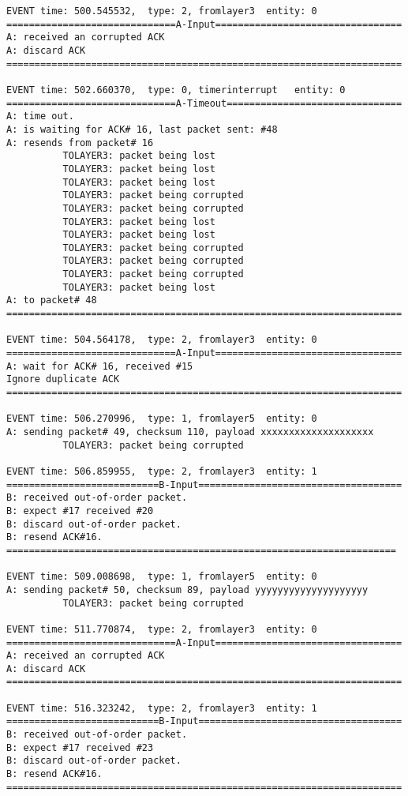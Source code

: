\documentclass[12pt]{article}
\begin{document}
\begin{verbatim}
EVENT time: 500.545532,  type: 2, fromlayer3  entity: 0
==============================A-Input=================================
A: received an corrupted ACK 
A: discard ACK
======================================================================

EVENT time: 502.660370,  type: 0, timerinterrupt   entity: 0
==============================A-Timeout===============================
A: time out. 
A: is waiting for ACK# 16, last packet sent: #48
A: resends from packet# 16 
          TOLAYER3: packet being lost
          TOLAYER3: packet being lost
          TOLAYER3: packet being lost
          TOLAYER3: packet being corrupted
          TOLAYER3: packet being corrupted
          TOLAYER3: packet being lost
          TOLAYER3: packet being lost
          TOLAYER3: packet being corrupted
          TOLAYER3: packet being corrupted
          TOLAYER3: packet being corrupted
          TOLAYER3: packet being lost
A: to packet# 48
======================================================================

EVENT time: 504.564178,  type: 2, fromlayer3  entity: 0
==============================A-Input=================================
A: wait for ACK# 16, received #15
Ignore duplicate ACK
======================================================================

EVENT time: 506.270996,  type: 1, fromlayer5  entity: 0
A: sending packet# 49, checksum 110, payload xxxxxxxxxxxxxxxxxxxx
          TOLAYER3: packet being corrupted

EVENT time: 506.859955,  type: 2, fromlayer3  entity: 1
===========================B-Input====================================
B: received out-of-order packet.
B: expect #17 received #20
B: discard out-of-order packet.
B: resend ACK#16.
=====================================================================

EVENT time: 509.008698,  type: 1, fromlayer5  entity: 0
A: sending packet# 50, checksum 89, payload yyyyyyyyyyyyyyyyyyyy
          TOLAYER3: packet being corrupted

EVENT time: 511.770874,  type: 2, fromlayer3  entity: 0
==============================A-Input=================================
A: received an corrupted ACK 
A: discard ACK
======================================================================

EVENT time: 516.323242,  type: 2, fromlayer3  entity: 1
===========================B-Input====================================
B: received out-of-order packet.
B: expect #17 received #23
B: discard out-of-order packet.
B: resend ACK#16.
======================================================================


\end{verbatim}
\end{document}
